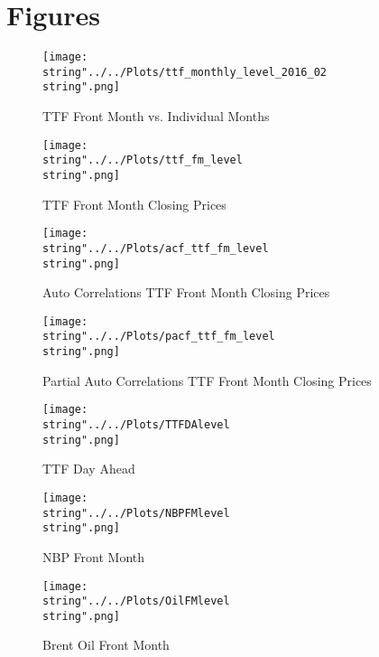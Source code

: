 \section{Figures}

\begin{figure}[ht]
  \centering
\texttt{[image: \\string"../../Plots/ttf\_monthly\_level\_2016\_02\\string".png]}
  \caption{TTF Front Month vs. Individual Months}\label{fig:ttf_monthly_level_2016_02}
\end{figure}



\begin{figure}[ht]
  \centering
\texttt{[image: \\string"../../Plots/ttf\_fm\_level\\string".png]}
  \caption{TTF Front Month Closing Prices}\label{fig:ttf_fm_level}
\end{figure}


\begin{figure}[ht]
  \centering
\texttt{[image: \\string"../../Plots/acf\_ttf\_fm\_level\\string".png]}
  \caption{Auto Correlations TTF Front Month Closing Prices}\label{fig:acf_ttf_fm_level}
\end{figure}

\begin{figure}[ht]
  \centering
\texttt{[image: \\string"../../Plots/pacf\_ttf\_fm\_level\\string".png]}
  \caption{Partial Auto Correlations TTF Front Month Closing Prices}\label{fig:pacf_ttf_fm_level}
\end{figure}

\begin{figure}[ht]
  \centering
\texttt{[image: \\string"../../Plots/TTFDAlevel\\string".png]}
  \caption{TTF Day Ahead}\label{fig:TTFDAlevel}
\end{figure}

\begin{figure}[ht]
  \centering
\texttt{[image: \\string"../../Plots/NBPFMlevel\\string".png]}
  \caption{NBP Front Month}\label{fig:NBPFMlevel}
\end{figure}

\begin{figure}[ht]
  \centering
\texttt{[image: \\string"../../Plots/OilFMlevel\\string".png]}
  \caption{Brent Oil Front Month}\label{fig:OilFMlevel}
\end{figure}

